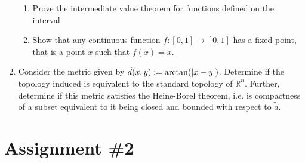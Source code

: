 \documentclass[notoc,notitlepage]{tufte-book}
\begin{document}
\begin{enumerate}
\begin{enumerate}
      \item Prove the intermediate value theorem for functions defined on the interval.
      \item Show that any continuous function $f : [0, 1] \to [0, 1]$ has a fixed point, that
        is a point $x$ such that $f(x) = x$.
    \end{enumerate}
  \item Consider the metric given by $\tilde{d}(x, y) := \arctan(\left| x- y \right|)$. Determine
    if the topology induced is equivalent to the standard topology of $\mathbb{R}^n$. Further,
    determine if this metric satisfies the Heine-Borel theorem, i.e. is compactness of a subset
    equivalent to it being closed and bounded with respect to $\tilde{d}$.
\end{enumerate}


\newpage

\section{Assignment \#2}%
\label{sec:assignment_2}
\end{document}
